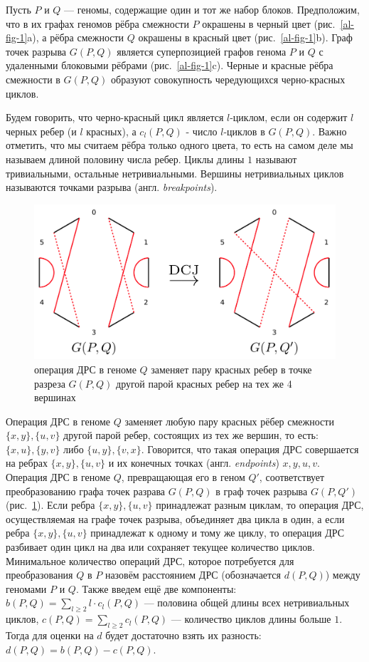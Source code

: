 Пусть $P$ и $Q$ --- геномы, содержащие один и тот же набор блоков.
Предположим, что в их графах геномов рёбра смежности $P$ окрашены в черный цвет (рис.~\ref{al-fig-1}a), а рёбра смежности $Q$ окрашены в красный цвет (рис.~\ref{al-fig-1}b).
Граф точек разрыва $G (P, Q)$ является суперпозицией графов генома $P$ и $Q$ с удаленными блоковыми рёбрами (рис.~\ref{al-fig-1}c).
Черные и красные рёбра смежности в $G (P, Q)$ образуют совокупность чередующихся черно-красных циклов.

Будем говорить, что черно-красный цикл является $l$-циклом, если он содержит $l$ черных ребер (и $l$ красных), а $c_l (P, Q)$ - число $l$-циклов в $G (P, Q)$. Важно отметить, что мы считаем рёбра только одного цвета, то есть на самом деле мы называем длиной половину числа ребер.
Циклы длины $1$ называют тривиальными, остальные нетривиальными.
Вершины нетривиальных циклов называются точками разрыва (англ. \textit{breakpoints}).

\begin{figure}[h!]
    \includegraphics[width=5in]{img/dcj.png}
    \caption{операция ДРС в геноме $Q$ заменяет пару красных ребер в точке разреза $G (P, Q)$ другой парой красных ребер на тех же 4 вершинах}
    \label{al-fig-2}
\end{figure}

Операция ДРС в геноме $Q$ заменяет любую пару красных рёбер смежности $\{x, y\}, \{u, v\}$ другой парой ребер, состоящих из тех же вершин, то есть: $\{x, u\}, \{y, v\}$ либо $\{u, y\} , \{v, x\}$.
Говорится, что такая операция ДРС совершается на ребрах $\{x, y\}, \{u, v\}$ и их конечных точках (англ. \textit{endpoints}) $x, y, u, v$.
Операция ДРС в геноме $Q$, превращающая его в геном $Q'$, соответствует преобразованию графа точек разрава $G (P, Q)$ в граф точек разрыва $G (P, Q')$ (рис.~\ref{al-fig-2}).
Если ребра $\{x, y\}, \{u, v\}$ принадлежат разным циклам, то операция ДРС, осуществляемая на графе точек разрыва, объединяет два цикла в один, а если ребра $\{x, y\}, \{u, v\}$ принадлежат к одному и тому же циклу, то операция ДРС разбивает один цикл на два или сохраняет текущее количество циклов.
Минимальное количество операций ДРС, которое потребуется для преобразования $Q$ в $P$ назовём расстоянием ДРС (обозначается $d(P, Q)$) между геномами $P$ и $Q$.
Также введем ещё две компоненты: $b (P, Q) = \sum_{l \geq 2} l \cdot c_l(P, Q)$ --- половина общей длины всех нетривиальных циклов, $c (P, Q) = \sum_{l \geq 2} c_l(P, Q)$ --- количество циклов длины больше $1$.
Тогда для оценки на $d$ будет достаточно взять их разность: $d (P, Q) = b (P, Q) - c (P, Q)$.

